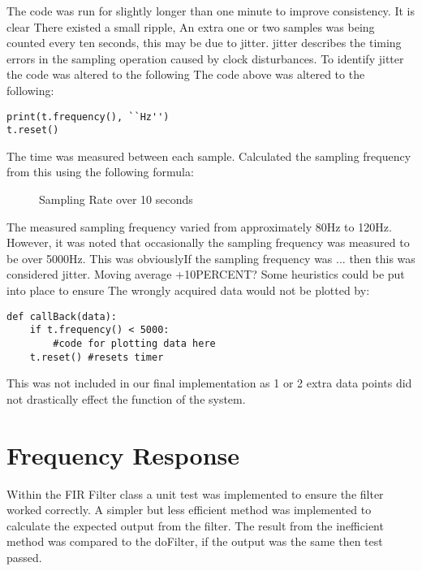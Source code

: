 \documentclass{article}
\begin{document}
\newline 
The code was run for slightly longer than one minute to improve consistency. It is clear There existed a small ripple, An extra one or two samples was being counted every ten seconds, this may be due to jitter. jitter describes the timing errors in the sampling operation caused by clock disturbances. To identify jitter the code was altered to the following The code above was altered to the following:
\lstset{language=Python}
\begin{lstlisting}
print(t.frequency(), ``Hz'') 
t.reset() 
\end{lstlisting}
The time was measured between each sample. Calculated the sampling frequency from this using the following formula:
\newline
\begin{figure}[h!]
    \centering
    
    \caption{Sampling Rate over 10 seconds}
    \label{fig:universe}
\end{figure}
\newline 
The measured sampling frequency varied from approximately 80Hz to 120Hz. However, it was noted that occasionally the sampling frequency was measured to be over 5000Hz. This was obviouslyIf the sampling frequency was ... then this was considered jitter. Moving average +10PERCENT? Some heuristics could be put into place to ensure The wrongly acquired data would not be plotted by:
\lstset{language=Python}
\begin{lstlisting}
def callBack(data):
    if t.frequency() < 5000:
        #code for plotting data here
    t.reset() #resets timer
\end{lstlisting}
This was not included in our final implementation as 1 or 2 extra data points did not drastically effect the function of the system.







\section{Frequency Response}
Within the FIR Filter class a unit test was implemented to ensure the filter worked correctly. A simpler but less efficient method was implemented to calculate the expected output from the filter. The result from the inefficient method was compared to the doFilter, if the output was the same then test passed.
\end{document}
